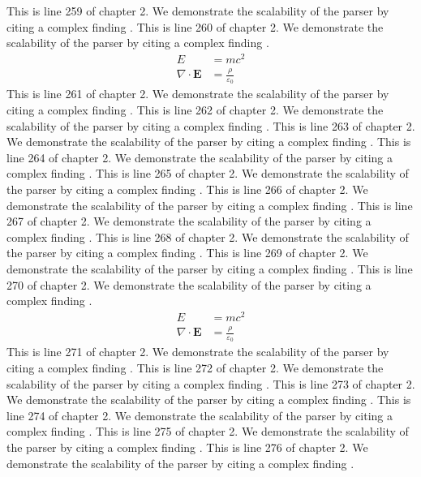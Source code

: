 This is line 259 of chapter 2. We demonstrate the scalability of the parser by citing a complex finding \cite{ref2_259}.
This is line 260 of chapter 2. We demonstrate the scalability of the parser by citing a complex finding \cite{ref2_260}.
\begin{align*}
  E &= mc^2 \\
  \nabla \cdot \mathbf{E} &= \frac{\rho}{\varepsilon_0}
\end{align*}
This is line 261 of chapter 2. We demonstrate the scalability of the parser by citing a complex finding \cite{ref2_261}.
This is line 262 of chapter 2. We demonstrate the scalability of the parser by citing a complex finding \cite{ref2_262}.
This is line 263 of chapter 2. We demonstrate the scalability of the parser by citing a complex finding \cite{ref2_263}.
This is line 264 of chapter 2. We demonstrate the scalability of the parser by citing a complex finding \cite{ref2_264}.
This is line 265 of chapter 2. We demonstrate the scalability of the parser by citing a complex finding \cite{ref2_265}.
This is line 266 of chapter 2. We demonstrate the scalability of the parser by citing a complex finding \cite{ref2_266}.
This is line 267 of chapter 2. We demonstrate the scalability of the parser by citing a complex finding \cite{ref2_267}.
This is line 268 of chapter 2. We demonstrate the scalability of the parser by citing a complex finding \cite{ref2_268}.
This is line 269 of chapter 2. We demonstrate the scalability of the parser by citing a complex finding \cite{ref2_269}.
This is line 270 of chapter 2. We demonstrate the scalability of the parser by citing a complex finding \cite{ref2_270}.
\begin{align*}
  E &= mc^2 \\
  \nabla \cdot \mathbf{E} &= \frac{\rho}{\varepsilon_0}
\end{align*}
This is line 271 of chapter 2. We demonstrate the scalability of the parser by citing a complex finding \cite{ref2_271}.
This is line 272 of chapter 2. We demonstrate the scalability of the parser by citing a complex finding \cite{ref2_272}.
This is line 273 of chapter 2. We demonstrate the scalability of the parser by citing a complex finding \cite{ref2_273}.
This is line 274 of chapter 2. We demonstrate the scalability of the parser by citing a complex finding \cite{ref2_274}.
This is line 275 of chapter 2. We demonstrate the scalability of the parser by citing a complex finding \cite{ref2_275}.
This is line 276 of chapter 2. We demonstrate the scalability of the parser by citing a complex finding \cite{ref2_276}.
